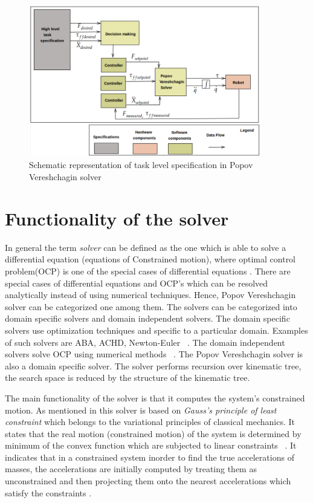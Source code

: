 \begin{figure}[h!]
	\centering
	\includegraphics[width=0.9\textwidth]{images/algo1}
	\caption{Schematic representation of task level specification in Popov Vereshchagin solver}
	\label{Controlscheme1}
\end{figure}

\section{Functionality of the solver}
In general the term \textit{solver} can be defined as the one which is able to solve a differential equation (equations of Constrained motion), where optimal control problem(OCP) is one of the special cases of differential equations \color{red}\cite{write this}\color{black}. There are special cases of differential equations and OCP's which can be resolved analytically instead of using numerical techniques. Hence, Popov Vereshchagin solver can be categorized one among them. The solvers can be categorized into domain specific solvers and domain independent solvers. The domain specific solvers use optimization techniques and specific to a particular domain. Examples of such solvers are ABA, ACHD, Newton-Euler ~\cite{shakhimardanov2015composable}. The domain independent solvers solve OCP using numerical methods ~\cite{shakhimardanov2015composable}. The Popov Vereshchagin solver is also a domain specific solver. The solver performs recursion over kinematic tree, the search space is reduced by the structure of the kinematic tree.


The main functionality of the solver is that it computes the system's constrained motion. As mentioned in \cite{vereshchagin1989modeling} this solver is based on \textit{Gauss's principle of least constraint} which belongs to the variational principles of classical mechanics. It states that the real motion (constrained motion) of the system is determined by minimum of the convex function which are subjected to linear constraints ~\cite{vereshchagin1989modeling}\cite{gauss1829neues}\cite{vukcevic2018extending}. It indicates that in a constrained system inorder to find the true accelerations of masses, the accelerations are initially computed by treating them as unconstrained and then projecting them onto the nearest accelerations which satisfy the constraints \cite{gauss}. 



